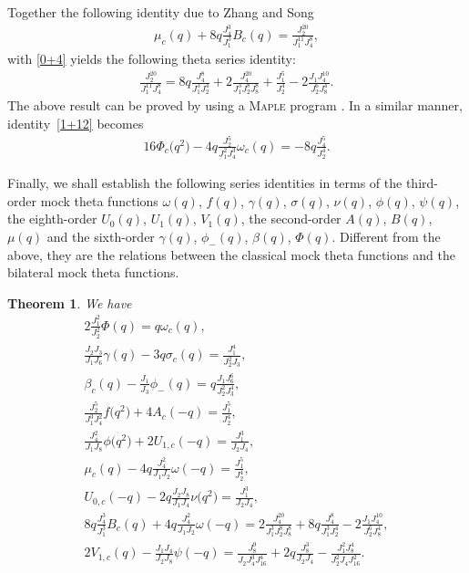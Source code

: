 \documentclass[10pt,a4paper]{amsart}
\numberwithin{equation}{section}
\newtheorem{Theorem}{Theorem}[section]
\begin{document}
\begin{Remark}
Together the following identity due to Zhang and Song \cite{ZS}
\begin{align*}%
\mu_c(q)+8q\frac{J_4^3}{J_1^3}B_c(q)=\frac{J_2^{20}}{J_1^{11}J_4^8},
\end{align*}
with \eqref{0+4} yields the following theta series identity:
\begin{align*}
\frac{J_2^{20}}{J_1^{11}J_4^8}=8q\frac{J_4^8}{J_1^3J_2^4}
+2\frac{J_4^{20}}{J_1^3J_2^8J_8^8}+\frac{J_1^5}{J_2^4}
-2\frac{J_1J_4^{10}}{J_2^6J_8^4}.
\end{align*}
The above result can be proved by using a \textsc{Maple} program \cite{FG}. In a similar manner, identity~\eqref{1+12} becomes
\begin{align*}
16\varPhi_c\bigl(q^2\bigr)-4q\frac{J_2^5}{J_1^2J_4^3}\omega_c(q)=-8q\frac{J_4^5}{J_2^4}.
\end{align*}
\end{Remark}

Finally, we shall establish the following series identities in terms of the third-order mock theta functions $\omega(q)$, $f(q)$, $\gamma(q)$, $\sigma(q)$, $\nu(q)$, $\phi(q)$, $\psi(q)$, the eighth-order $U_0(q)$, $U_1(q)$, $V_1(q)$, the second-order $A(q)$, $B(q)$, $\mu(q)$ and the sixth-order $\gamma(q)$, $\phi_-(q)$, $\beta(q)$, $\varPhi(q)$. Different from the above, they are the relations between the classical mock theta functions and the bilateral mock theta functions.
\begin{Theorem}\label{1+6}
We have
\begin{gather}
2\frac{J_1^2}{J_2^2}\varPhi(q)= q\omega_c(q),\label{1+13}\\
\frac{J_2J_3}{J_1J_6}\gamma(q)-3q\sigma_c(q)= \frac{J_1^4}{J_2^2J_3},\label{1+7}\\
\beta_c(q)-\frac{J_1}{J_3}\phi_-(q)= q\frac{J_1J_6^6}{J_2^2J_3^4},\label{1+8}\\
\frac{J_2^5}{J_1^3J_4^2}f\bigl(q^2\bigr)+4A_c(-q)= \frac{J_1^5}{J_2^4},\label{1+14}\\
\frac{J_4^2}{J_1J_8}\phi\bigl(q^2\bigr)+2U_{1,c}(-q)= \frac{J_1^3}{J_2J_4},\label{1+15}\\
\mu_c(q)-4q\frac{J_4^2}{J_1J_2}\omega(-q)= \frac{J_1^5}{J_2^4},\label{1+16}\\
U_{0,c}(-q)-2q\frac{J_2J_8}{J_1J_4}\nu\bigl(q^2\bigr)= \frac{J_1^3}{J_2J_4},\label{1+17}\\
8q\frac{J_4^3}{J_1^3}B_c(q)+4q\frac{J_4^2}{J_1J_2}\omega(-q)= 2\frac{J_4^{20}}{J_1^3J_2^8J_8^8}
+8q\frac{J_4^8}{J_1^3J_2^4}-2\frac{J_1J_4^{10}}{J_2^6J_8^4},\label{1+18}\\
2V_{1,c}(q)-\frac{J_1J_4}{J_2J_8}\psi(-q)= \frac{J_8^9}{J_2J_4^3J_{16}^4}+2q\frac{J_8^3}{J_2J_4}-\frac{J_1^2J_8^4}{J_2^2J_4J_{16}^2}.\label{1+19}
\end{gather}
\end{Theorem}
\end{document}
